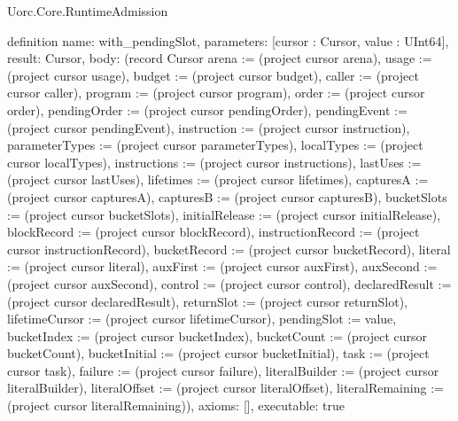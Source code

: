 \begin{lexlean}{Uorc.Core.RuntimeAdmission}
\begin{semanticmodule}
definition{
  name: with_pendingSlot,
  parameters: [cursor : Cursor, value : UInt64],
  result: Cursor,
  body: (record Cursor {arena := (project cursor arena), usage := (project cursor usage), budget := (project cursor budget), caller := (project cursor caller), program := (project cursor program), order := (project cursor order), pendingOrder := (project cursor pendingOrder), pendingEvent := (project cursor pendingEvent), instruction := (project cursor instruction), parameterTypes := (project cursor parameterTypes), localTypes := (project cursor localTypes), instructions := (project cursor instructions), lastUses := (project cursor lastUses), lifetimes := (project cursor lifetimes), capturesA := (project cursor capturesA), capturesB := (project cursor capturesB), bucketSlots := (project cursor bucketSlots), initialRelease := (project cursor initialRelease), blockRecord := (project cursor blockRecord), instructionRecord := (project cursor instructionRecord), bucketRecord := (project cursor bucketRecord), literal := (project cursor literal), auxFirst := (project cursor auxFirst), auxSecond := (project cursor auxSecond), control := (project cursor control), declaredResult := (project cursor declaredResult), returnSlot := (project cursor returnSlot), lifetimeCursor := (project cursor lifetimeCursor), pendingSlot := value, bucketIndex := (project cursor bucketIndex), bucketCount := (project cursor bucketCount), bucketInitial := (project cursor bucketInitial), task := (project cursor task), failure := (project cursor failure), literalBuilder := (project cursor literalBuilder), literalOffset := (project cursor literalOffset), literalRemaining := (project cursor literalRemaining)}),
  axioms: [],
  executable: true
}


\end{semanticmodule}
\end{lexlean}
